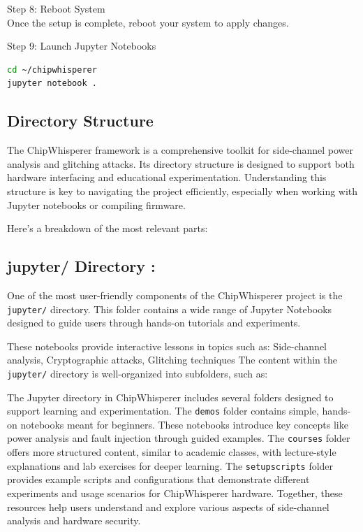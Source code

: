 Step 8: Reboot System\\
Once the setup is complete, reboot your system to apply changes.

Step 9: Launch Jupyter Notebooks\\
\begin{lstlisting}[language=bash]
cd ~/chipwhisperer
jupyter notebook .
\end{lstlisting}

\subsection{Directory Structure}
The ChipWhisperer framework is a comprehensive toolkit for side-channel power analysis and glitching attacks. Its directory structure is designed to support both hardware interfacing and educational experimentation. Understanding this structure is key to navigating the project efficiently, especially when working with Jupyter notebooks or compiling firmware.

Here’s a breakdown of the most relevant parts:

\subsection*{jupyter/ Directory :}
One of the most user-friendly components of the ChipWhisperer project is the \texttt{jupyter/} directory. This folder contains a wide range of Jupyter Notebooks designed to guide users through hands-on tutorials and experiments.

These notebooks provide interactive lessons in topics such as: Side-channel analysis, Cryptographic attacks, Glitching techniques
The content within the \texttt{jupyter/} directory is well-organized into subfolders, such as:

The Jupyter directory in ChipWhisperer includes several folders designed to support learning and experimentation. The \texttt{demos} folder contains simple, hands-on notebooks meant for beginners. These notebooks introduce key concepts like power analysis and fault injection through guided examples. The \texttt{courses} folder offers more structured content, similar to academic classes, with lecture-style explanations and lab exercises for deeper learning. The \texttt{setupscripts} folder provides example scripts and configurations that demonstrate different experiments and usage scenarios for ChipWhisperer hardware. Together, these resources help users understand and explore various aspects of side-channel analysis and hardware security.

